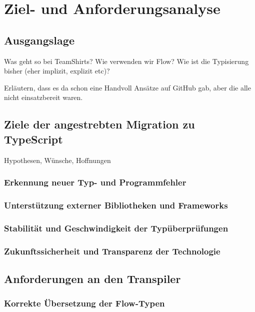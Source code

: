\chapter{Ziel- und Anforderungsanalyse}
\label{chap:analysis}

\section{Ausgangslage}
\label{sec:status-quo}

Was geht so bei TeamShirts? Wie verwenden wir Flow? Wie ist die Typisierung bisher (eher implizit, explizit etc)?

Erläutern, dass es da schon eine Handvoll Ansätze auf GitHub gab, aber die alle nicht einsatzbereit waren.

\section{Ziele der angestrebten Migration zu TypeScript}

Hypothesen, Wünsche, Hoffnungen

  \subsection{Erkennung neuer Typ- und Programmfehler}
  \subsection{Unterstützung externer Bibliotheken und Frameworks}
  \subsection{Stabilität und Geschwindigkeit der Typüberprüfungen}
  \subsection{Zukunftssicherheit und Transparenz der Technologie}

\section{Anforderungen an den Transpiler}

  \subsection{Korrekte Übersetzung der Flow-Typen}
  \label{subsection:requirement:correct-translation}

